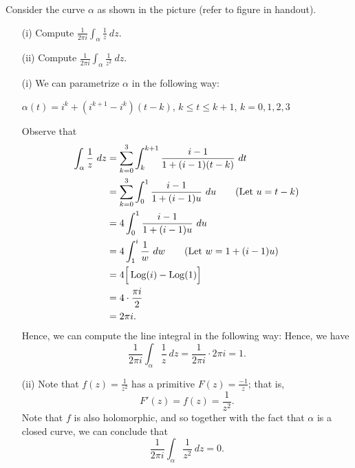 \documentclass[a4paper]{article}
\begin{document}
\begin{problem}
    Consider the curve \( \alpha \) as shown in the picture (refer to figure in handout). 
    \begin{enumerate}
        \item[(i)] Compute \( \displaystyle \frac{ 1 }{ 2 \pi i  } \displaystyle \int_{ \alpha }^{  }  \frac{ 1 }{ z }   \ dz  \).
        \item[(ii)] Compute \( \displaystyle \frac{ 1 }{ 2 \pi i  } \displaystyle \int_{\alpha}^{}  \frac{ 1 }{ z^{2} }  \ dz  \).
    \end{enumerate}
\end{problem}

\begin{solution}
\begin{enumerate}
    \item[(i)] We can parametrize \( \alpha  \) in the following way:
        \begin{center}
            \( \alpha(t) =  i^{k} + (i^{k+1} - i^{k})(t-k) \), \( k \leq t \leq k + 1  \), \( k = 0,1,2,3 \)
        \end{center}
        Observe that 
        \begin{align*}
            \int_{ \alpha }^{  } \frac{ 1 }{ z }  \ dz &= \sum_{ k=0 }^{ 3 } \int_{ k  }^{  k+1 } \frac{ i - 1  }{ 1 + (i-1)(t-k) }  \ dt \\
                                                       &= \sum_{ k=0  }^{  3  } \int_{  0  }^{ 1  }  \frac{  i - 1  }{ 1 + (i-1)u }  \ du \tag{Let \( u = t - k \)} \\
                                                       &= 4 \int_{  0  }^{  1  }  \frac{  i - 1  }{  1 + (i-1 )u }  \ du  \\
                                                       &= 4 \int_{  1  }^{ i  }  \frac{ 1  }{ w  }   \ dw \tag{Let \( w = 1 + (i-1)u \)} \\
                                                       &= 4 \Big[ \operatorname{Log}(i) - \operatorname{Log}(1) \Big] \\
                                                       &= 4 \cdot \frac{ \pi i  }{ 2  } \\
                                                       &= 2 \pi i.
        \end{align*}
        Hence, we can compute the line integral in the following way:
        Hence, we have
        \[  \frac{ 1 }{ 2 \pi i  }  \int_{ \alpha }^{  }  \frac{ 1 }{ z }  \ dz =  \frac{ 1  }{  2 \pi i  } \cdot 2 \pi i  = 1.  \]

    \item[(ii)] Note that \( f(z) = \frac{ 1 }{ z^{2} }  \) has a primitive \( F(z) = \frac{ -1 }{ z }  \); that is, 
        \[  F'(z) = f(z) =  \frac{ 1 }{ z^{2} }.  \]
        Note that \( f  \) is also holomorphic, and so together with the fact that \( \alpha  \) is a closed curve, we can conclude that 
        \[  \frac{ 1 }{ 2 \pi i  }  \int_{ \alpha }^{  }  \frac{ 1 }{ z^{2} }  \ dz = 0.  \]
\end{enumerate}
\end{solution}
\end{document}
